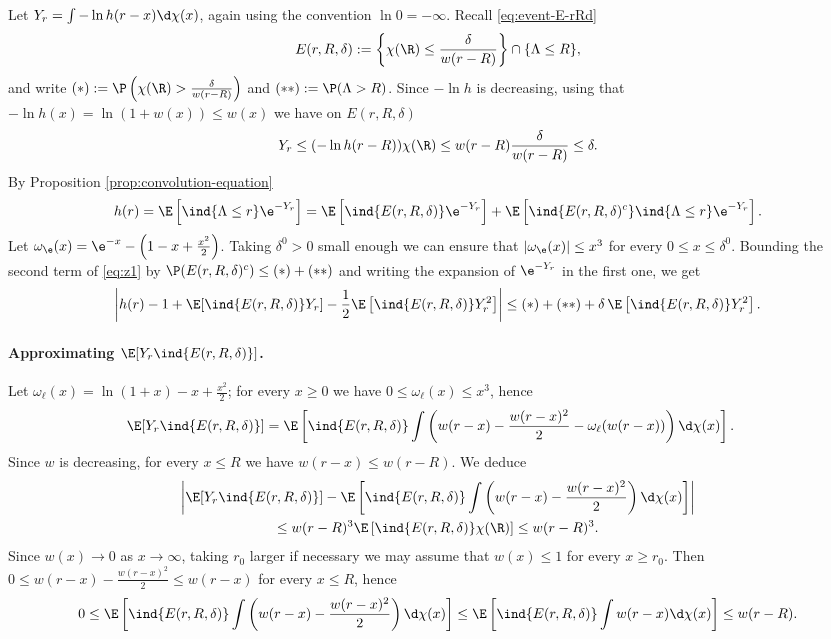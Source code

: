 \documentclass[10pt,a4paper]{article}
\begin{document}
Let $Y_r = \int -\ln h(r-x)\d\chi(x)$, again using the convention $\ln 0 = -\infty$. 
Recall \eqref{eq:event-E-rRd}
\begin{equation*}
E(r,R,\delta) := \left\{\chi(\R)\leq \frac{\delta}{w(r-R)} \right\} \cap \{ \Lambda \leq R \} ,
\end{equation*} 
and write $(*) := \P\left( \chi(\R) > \frac{\delta}{w(r-R)} \right)$ and $(**) := \P(\Lambda > R)$. 
Since $-\ln h$ is decreasing, using that $-\ln h(x) = \ln(1+w(x)) \leq w(x)$ we have on $E(r,R,\delta)$
\[ Y_r \leq (-\ln h(r-R)) \chi(\R) \leq w(r-R) \frac{\delta}{w(r-R)} \leq \delta . \]
By Proposition \ref{prop:convolution-equation}
\begin{align}\label{eq:z1}
h(r) = \E\left[ \ind{\Lambda\leq r} \e^{-Y_r} \right] = \E\left[ \ind{E(r,R,\delta)} \e^{-Y_r} \right] + \E\left[\ind{E(r,R,\delta)^c} \ind{\Lambda\leq r} \e^{-Y_r}\right] .
\end{align}
Let $\omega_\e(x) = \e^{-x} - \left(1-x+\frac{x^2}{2}\right)$. Taking $\delta^0>0$ small enough we can ensure that $|\omega_\e(x)| \leq x^3$ for every $0\leq x \leq \delta^0$. 
Bounding the second term of \eqref{eq:z1} by $\P(E(r,R,\delta)^c) \leq (*) + (**)$ and writing the expansion of $\e^{-Y_r}$ in the first one, we get  
\begin{equation*}
\left| h(r) - 1 + \E[\ind{E(r,R,\delta)} Y_r] - \frac{1}{2}\E\left[ \ind{E(r,R,\delta)} Y_r^2 \right] \right| \leq (*) + (**) + \delta \, \E\left[ \ind{E(r,R,\delta)} Y_r^2  \right] .
\end{equation*}


\paragraph{Approximating $\E[Y_r \ind{E(r,R,\delta)}]$.}
Let $\omega_\ell(x) = \ln(1+x) - x + \frac{x^2}{2}$; for every $x\geq 0$ we have $0\leq \omega_\ell(x) \leq x^3$, hence  
\begin{align*}
\E[Y_r \ind{E(r,R,\delta)}] &= \E\left[\ind{E(r,R,\delta)} \int \left( w(r-x) - \frac{w(r-x)^2}{2} - \omega_\ell(w(r-x)) \right) \d \chi(x) \right]  .
\end{align*}
Since $w$ is decreasing, for every $x\leq R$ we have $w(r-x) \leq w(r-R)$. We deduce 
\begin{multline}\label{eq:approx-Yr1}
\left| \E[Y_r \ind{E(r,R,\delta)}] - \E\left[ \ind{E(r,R,\delta)} \int \left( w(r-x) - \frac{w(r-x)^2}{2} \right) \d\chi(x) \right] \right| \\
\leq w(r-R)^3 \E\left[ \ind{E(r,R,\delta)} \chi(\R) \right] \leq w(r-R)^3 .
\end{multline}
Since $w(x)\to 0$ as $x\to\infty$, taking $r_0$ larger if necessary we may assume that $w(x) \leq 1$ for every $x\geq r_0$. 
Then $0\leq w(r-x)-\frac{w(r-x)^2}{2} \leq w(r-x) $ for every $x\leq R$, hence 
\begin{equation}\label{eq:bound-Yr1}
0\leq \E\left[ \ind{E(r,R,\delta)} \int \left( w(r-x) - \frac{w(r-x)^2}{2} \right) \d\chi(x) \right] \leq \E\left[ \ind{E(r,R,\delta)} \int w(r-x) \d\chi(x) \right] \leq w(r-R) . 
\end{equation} 
\end{document}
